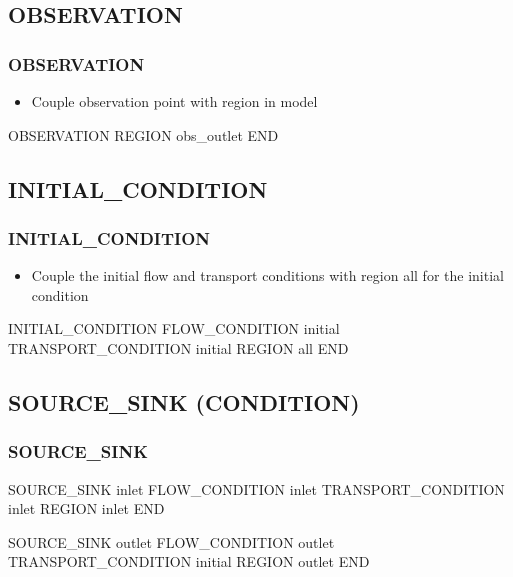 \documentclass{beamer}
\newcommand\greencomment[1]{{{\color{green} #1}}}
\begin{document}
\subsection{OBSERVATION}

\begin{frame}[fragile]\frametitle{\bf OBSERVATION}

\begin{itemize}
\item Couple observation point with region in model
\end{itemize}

\begin{semiverbatim}
OBSERVATION
  REGION obs_outlet
END
\end{semiverbatim}

\end{frame}

\subsection{INITIAL\_CONDITION}

\begin{frame}[fragile]\frametitle{\bf INITIAL\_CONDITION}

\begin{itemize}
\item Couple the \greencomment{initial} flow and transport conditions with region \greencomment{all} for the initial condition
\end{itemize}

\begin{semiverbatim}

INITIAL_CONDITION
  FLOW_CONDITION initial
  TRANSPORT_CONDITION initial
  REGION all
END

\end{semiverbatim}

\end{frame}


\subsection{SOURCE\_SINK (CONDITION)}

\begin{frame}[fragile]
\frametitle{\bf SOURCE\_SINK}

\begin{semiverbatim}

SOURCE_SINK \greencomment{inlet}
  FLOW_CONDITION \greencomment{inlet}
  TRANSPORT_CONDITION \greencomment{inlet}
  REGION inlet
END

SOURCE_SINK outlet
  FLOW_CONDITION outlet
  TRANSPORT_CONDITION initial
  REGION outlet
END
\end{semiverbatim}

\end{frame}
\end{document}
